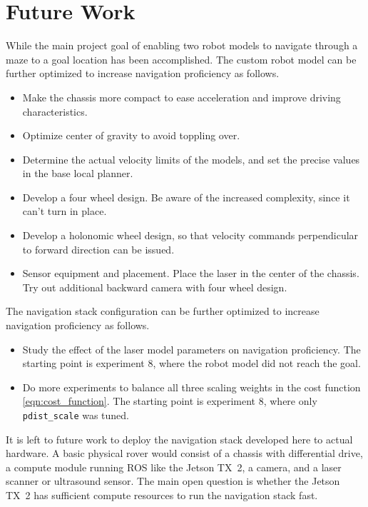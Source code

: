 \documentclass[10pt,journal,compsoc]{IEEEtran}
\begin{document}
\section{Future Work}
\label{sec:future_work}
While the main project goal of enabling two robot models to navigate through a maze to a goal location has been accomplished. The custom robot model can be further optimized to increase navigation proficiency as follows.
\begin{itemize}
\item Make the chassis more compact to ease acceleration and improve driving characteristics. 
\item Optimize center of gravity to avoid toppling over.
\item Determine the actual velocity limits of the models, and set the precise values in the base local planner.
\item Develop a four wheel design. Be aware of the increased complexity, since it can't turn in place.
\item Develop a holonomic wheel design, so that velocity commands perpendicular to forward direction can be issued.
\item Sensor equipment and placement. Place the laser in the center of the chassis. Try out additional backward camera with four wheel design.
\end{itemize}
The navigation stack configuration can be further optimized to increase navigation proficiency as follows.
\begin{itemize}
\item Study the effect of the laser model parameters on navigation proficiency. The starting point is experiment 8, where the robot model did not reach the goal.
\item Do more experiments to balance all three scaling weights in the cost function \ref{eqn:cost_function}. The starting point is experiment 8, where only \texttt{pdist\_scale} was tuned.
\end{itemize}

It is left to future work to deploy the navigation stack developed here to actual hardware. A basic physical rover would consist of a chassis with differential drive, a compute module running ROS like the Jetson TX\ 2, a camera, and a laser scanner or ultrasound sensor. The main open question is whether the Jetson TX\ 2 has sufficient compute resources to run the navigation stack fast.
\end{document}
